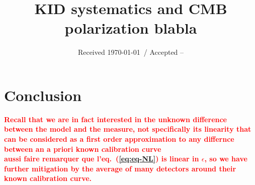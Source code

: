 \documentclass[twocolumn, traditabstract]{aa}
\newcommand{\todo}[1]{\textcolor{red}{\textbf{#1}}}
\begin{document}
\title{KID systematics and CMB polarization blabla}

\date{Received \today \ / Accepted --}
	
\tableofcontents
\maketitle



%



%


\section{Conclusion}
\label{conclusion}

\todo{Recall that we are in fact interested in the unknown difference between
  the model and the measure, not specifically its linearity that can be
  considered as a first order approximation to any differnce between an a priori
  known calibration curve}\\

\todo{aussi faire remarquer que l'eq.~(\ref{eq:eq-NL}) is linear in $\epsilon$,
  so we have further mitigation by the average of many detectors around their
  known calibration curve.}\\
\end{document}
